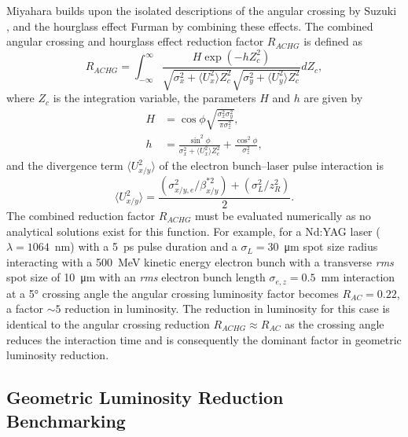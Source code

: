 \documentclass[../main.tex]{subfiles}
\begin{document}
Miyahara \cite{miyahara2008luminosity} builds upon the isolated descriptions of the angular crossing by Suzuki \cite{suzuki1976general}, and the hourglass effect Furman \cite{furman1991hourglas} by combining these effects. The combined angular crossing and hourglass effect reduction factor $R_{ACHG}$ is defined as
\begin{equation}
R_{ACHG} = \int_{-\infty}^{\infty}\frac{H\exp\left(-hZ_{c}^{2}\right)}{\sqrt{\sigma_{x}^{2}+\langle U_{x}^2\rangle Z_{c}^{2}}\sqrt{\sigma_{y}^{2}+\langle U_{y}^{2}\rangle Z_{c}^{2}}}dZ_{c},
\label{eq:miyahara_combined_reduction}    
\end{equation}
where $Z_{c}$ is the integration variable, the parameters $H$ and $h$ are given by
\begin{align}
H &= \cos\phi\sqrt{\frac{\sigma_{x}^{2}\sigma_{y}^{2}}{\pi\sigma_{z}^{2}}},
\label{eq:miyahara_H_parameter} \\
h &= \frac{\sin^{2}\phi}{\sigma_{x}^{2}+\langle U_{x}^{2}\rangle Z_{c}^{2}}+\frac{\cos^{2}\phi}{\sigma_{z}^{2}},
\label{eq:miyahara_h_parameter}
\end{align}
and the divergence term $\langle U_{x/y}^{2}\rangle$ of the electron bunch--laser pulse interaction is
\begin{equation}
\langle U_{x/y}^{2}\rangle = \frac{\left(\sigma_{x/y,e}^{2}/\beta_{x/y}^{*2}\right)+\left(\sigma_{L}^{2}/z_{R}^{2}\right)}{2}.    
\end{equation}
The combined reduction factor $R_{ACHG}$ must be evaluated numerically as no analytical solutions exist for this function.
For example, for a Nd:YAG laser ($\lambda = 1064$~\si{\nano\meter}) with a 5~\si{\pico\second} pulse duration and a $\sigma_{L} = 30$~\si{\micro\meter} spot size radius interacting with a 500~\si{\mega\electronvolt} kinetic energy electron bunch with a transverse \textit{rms} spot size of 10~\si{\micro\meter} with an \textit{rms} electron bunch length $\sigma_{e,z} = 0.5$~\si{\milli\meter} interaction at a 5\si{\degree} crossing angle the angular crossing luminosity factor becomes $R_{AC} = 0.22$, a factor $\sim5$ reduction in luminosity. The reduction in luminosity for this case is identical to the angular crossing reduction $R_{ACHG}\approx R_{AC}$ as the crossing angle reduces the interaction time and is consequently the dominant factor in geometric luminosity reduction.

\subsection{Geometric Luminosity Reduction Benchmarking}
\end{document}
